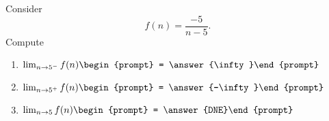 \documentclass{ximera}
\author{Bart Snapp}
\begin{document}
\begin{exercise}
Consider 
\[
f(n) = \frac{-5}{n-5}.
\]
Compute
\begin{enumerate}
\item $\lim_{n\to 5^- } f(n) \begin{prompt} = \answer{\infty}\end{prompt}$
\item $\lim_{n\to 5^+ } f(n) \begin{prompt} = \answer{-\infty}\end{prompt}$
\item $\lim_{n\to 5 } f(n) \begin{prompt} = \answer{DNE}\end{prompt}$
\end{enumerate}
\end{exercise}
\end{document}
